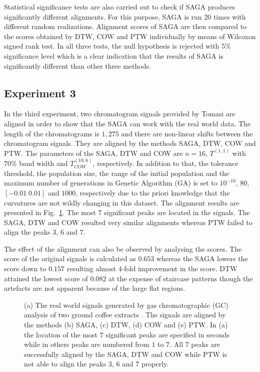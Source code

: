 \documentclass[number,1p,12pt]{elsarticle}
\begin{document}
Statistical significance tests are also carried out to check if SAGA produces significantly different alignments. For this purpose, SAGA is run $20$ times with different random realizations. Alignment scores of SAGA are then compared to the scores obtained by DTW, COW and PTW individually by means of Wilcoxon signed rank test. In all three tests, the null hypothesis is rejected with 5\% significance level which is a clear indication that the results of SAGA is significantly different than other three methods. 

\subsection{Experiment 3}
In the third experiment, two chromatogram signals provided by Tomasi \cite{Tomasi2004} are aligned in order to show that the SAGA can work with the real world data. The length of the chromatograms is $1,275$ and there are non-linear shifts between the chromatogram signals. They are aligned by the methods SAGA, DTW, COW and PTW. The parameters of the SAGA, DTW and COW are $n=16$,  $T^{(1,1)}$ with $70\%$ band width and  $T_{COW}^{(10,6)}$, respectively. In addition to that, the tolerance threshold, the population size, the range of the initial population and the maximum number of generations in Genetic Algorithm (GA) is set to $10^{-10}$, $80$, $[-0.01\;0.01]$ and $1000$, respectively due to the priori knowledge that the curvatures are not wildly changing in this dataset. The alignment results are presented in Fig.~\ref{Figure08}. The most $7$ significant peaks are located in the signals. The SAGA, DTW and COW resulted very similar alignments whereas PTW failed to align the peaks $3$, $6$ and $7$. 

The effect of the alignment can also be observed by analysing the scores. The score of the original signals is calculated as $0.653$ whereas the SAGA lowers the score down to $0.157$ resulting almost $4$-fold improvement in the score. DTW attained the lowest score of $0.082$ at the expense of staircase patterns though the artefacts are not apparent because of the large flat regions.

\begin{figure}
\caption{(a) The real world signals generated by gas chromatographic (GC) analysis of  two ground coffee extracts \cite{Tomasi2004}. The signals are aligned by the methods (b) SAGA, (c) DTW, (d) COW and (e) PTW. In (a) the location of the most $7$ significant peaks are specified in seconds while in others peaks are numbered from $1$ to $7$. All $7$ peaks are successfully aligned by the SAGA, DTW and COW while PTW is not able to align the peaks $3$, $6$ and $7$ properly. }
\label{Figure08}
\end{figure} 
\end{document}
